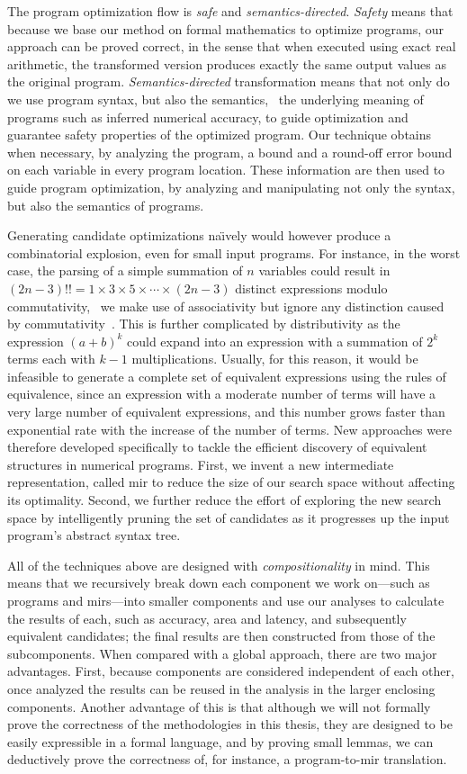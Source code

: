 The program optimization flow is \emph{safe} and \emph{semantics-directed}.
\emph{Safety} means that because we base our method on formal mathematics to
optimize programs, our approach can be proved correct, in the sense that when
executed using exact real arithmetic, the transformed version produces exactly
the same output values as the original program. \emph{Semantics-directed}
transformation means that not only do we use program syntax, but also the
semantics, \ie~the underlying meaning of programs such as inferred numerical
accuracy, to guide optimization and guarantee safety properties of the
optimized program.  Our technique obtains when necessary, by analyzing the
program, a bound and a round-off error bound on each variable in every program
location.  These information are then used to guide program optimization, by
analyzing and manipulating not only the syntax, but also the semantics of
programs.

Generating candidate optimizations na{\"\i}vely would however produce a
combinatorial explosion, even for small input programs.  For instance, in the
worst case, the parsing of a simple summation of $n$ variables could result
in $(2n - 3)!! = 1 \times 3 \times 5 \times \cdots \times (2n - 3)$ distinct
expressions modulo commutativity, \ie~we make use of associativity but ignore
any distinction caused by commutativity~\cite{ioualalen, mouilleron}.  This is
further complicated by distributivity as the expression ${(a + b)}^k$ could
expand into an expression with a summation of $2^k$ terms each with $k - 1$
multiplications.  Usually, for this reason, it would be infeasible to generate
a complete set of equivalent expressions using the rules of equivalence, since
an expression with a moderate number of terms will have a very large number of
equivalent expressions, and this number grows faster than exponential rate with
the increase of the number of terms.  New approaches were therefore developed
specifically to tackle the efficient discovery of equivalent structures in
numerical programs.  First, we invent a new intermediate representation,
called \gls{mir} to reduce the size of our search space without affecting its
optimality.  Second, we further reduce the effort of exploring the new search
space by intelligently pruning the set of candidates as it progresses up the
input program's abstract syntax tree.

All of the techniques above are designed with \emph{compositionality} in mind.
This means that we recursively break down each component we work on---such
as programs and \glspl{mir}---into smaller components and use our analyses
to calculate the results of each, such as accuracy, area and latency, and
subsequently equivalent candidates; the final results are then constructed from
those of the subcomponents.  When compared with a global approach, there are
two major advantages.  First, because components are considered independent
of each other, once analyzed the results can be reused in the analysis in the
larger enclosing components.  Another advantage of this is that although we
will not formally prove the correctness of the methodologies in this thesis,
they are designed to be easily expressible in a formal language, and by proving
small lemmas, we can deductively prove the correctness of, for instance, a
program-to-\gls{mir} translation.
